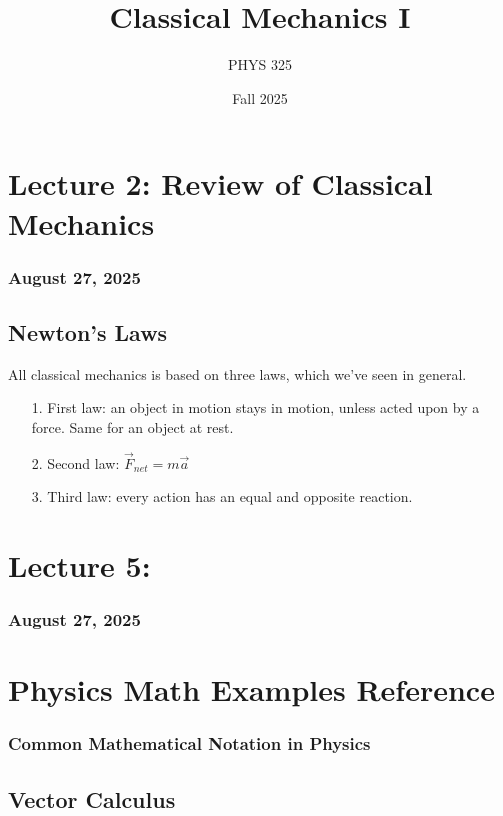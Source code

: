 \documentclass{article}
\title{Classical Mechanics I}
\author{PHYS 325}
\date{Fall 2025}
\begin{document}
\maketitle

\newpage
\tableofcontents
\newpage

\section{Lecture 2: Review of Classical Mechanics}
\subsubsection*{August 27, 2025}

\subsection{Newton's Laws}
\begin{conceptbox}
All classical mechanics is based on three laws, which we've seen in general.
\begin{itemize}
    \item[1.] First law: an object in motion stays in motion, unless acted upon by a force. Same for an object at rest.
    \item[2.] Second law: $\vec{F}_{net} = m\vec{a}$
    \item[3.] Third law: every action has an equal and opposite reaction.
\end{itemize} 
\end{conceptbox}

\newpage
\section{Lecture 5: }
\subsubsection*{August 27, 2025}


\newpage
\section{Physics Math Examples Reference}
\subsubsection*{Common Mathematical Notation in Physics}

\subsection{Vector Calculus}
\end{document}
